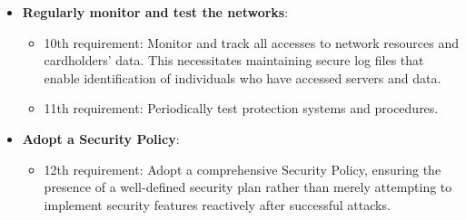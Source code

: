 \begin{itemize}
    \item \textbf{Regularly monitor and test the networks}:
    \begin{itemize}
        \item 10th requirement: Monitor and track all accesses to network resources and cardholders' data. This necessitates maintaining secure log files that enable identification of individuals who have accessed servers and data.
        \item 11th requirement: Periodically test protection systems and procedures.
    \end{itemize}

    \item \textbf{Adopt a Security Policy}:
    \begin{itemize}
        \item 12th requirement: Adopt a comprehensive Security Policy, ensuring the presence of a well-defined security plan rather than merely attempting to implement security features reactively after successful attacks.
    \end{itemize}
\end{itemize}
